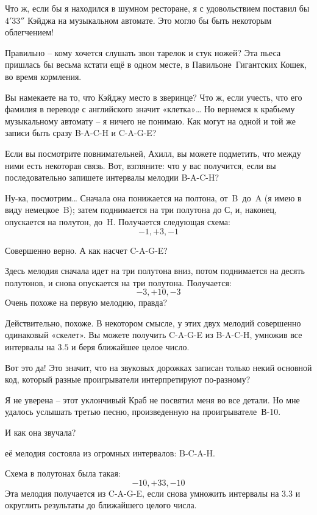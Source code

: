 \documentclass[../main.tex]{subfiles}
\begin{document}
\begin{dialogue}
 Что ж, если бы я находился в шумном ресторане, я с удовольствием поставил бы $4'33''$ Кэйджа на музыкальном автомате. Это могло бы быть некоторым облегчением!

 Правильно \--- кому хочется слушать звон тарелок и стук ножей? Эта пьеса пришлась бы весьма кстати ещё в одном месте, в Павильоне~Гигантских Кошек, во время кормления.

 Вы намекаете на то, что Кэйджу место в зверинце? Что ж, если учесть, что его фамилия в переводе с английского значит «клетка»\ldots{} Но вернемся к крабьему музыкальному автомату \--- я ничего не понимаю. Как могут на одной и той же записи быть сразу \mbox{B-A-C-H} и \mbox{C-A-G-E}?

 Если вы посмотрите повнимательней, Ахилл, вы можете подметить, что между ними есть некоторая связь. Вот, взгляните: что у вас получится, если вы последовательно запишете интервалы мелодии \mbox{B-A-C-H}?

 Ну-ка, посмотрим\ldots{} Сначала она понижается на полтона, от~B~до~A (я имею в виду немецкое~B); затем поднимается на три полутона до С, и, наконец, опускается на полутон, до~H. Получается следующая схема:
\[
    -1, +3, -1
\]

 Совершенно верно. А как насчет \mbox{C-A-G-E}?

 Здесь мелодия сначала идет на три полутона вниз, потом поднимается на десять полутонов, и снова опускается на три полутона. Получается:
\[
    -3, +10, -3
\]
Очень похоже на первую мелодию, правда?

 Действительно, похоже. В некотором смысле, у этих двух мелодий совершенно одинаковый «скелет». Вы можете получить \mbox{C-A-G-E} из \mbox{B-A-C-H}, умножив все интервалы на $3.5$ и беря ближайшее целое число.

 Вот это да! Это значит, что на звуковых дорожках записан только некий основной код, который разные проигрыватели интерпретируют по-разному?

 Я не уверена \--- этот уклончивый Краб не посвятил меня во все детали. Но мне удалось услышать третью песню, произведенную на проигрывателе~\mbox{В-10}.

 И как она звучала?

 её мелодия состояла из огромных интервалов: \mbox{B-C-A-H}.

Схема в полутонах была такая:
\[
    -10, +33, -10
\]
Эта мелодия получается из \mbox{C-A-G-E}, если снова умножить интервалы на $3.3$ и округлить результаты до ближайшего целого числа.


\end{dialogue}
\end{document}
